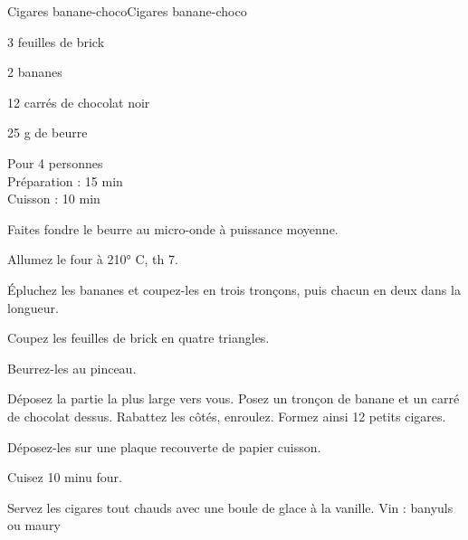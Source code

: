 \begin{recette}{Cigares banane-choco}{Cigares banane-choco}

\begin{ingredients}
3 feuilles de brick\par
2 bananes\par
12 carrés de chocolat noir\par
25 g de beurre\par
\end{ingredients}

\begin{infos}
Pour 4 personnes\\
Préparation : 15 min\\
Cuisson : 10 min\\
\end{infos}

\begin{etapes}
\item Faites fondre le beurre au micro-onde à puissance moyenne.
\item Allumez le four à 210° C, th 7.
\item Épluchez les bananes et coupez-les en trois tronçons, puis chacun en deux dans la longueur.
\item Coupez les feuilles de brick en quatre triangles.
\item Beurrez-les au pinceau.
\item Déposez la partie la plus large vers vous. Posez un tronçon de banane et un carré de chocolat dessus. Rabattez les côtés, enroulez. Formez ainsi 12 petits cigares.
\item Déposez-les sur une plaque recouverte de papier cuisson.
\item Cuisez 10 minu four.
\end{etapes}

\begin{conseils}
Servez les cigares tout chauds avec une boule de glace à la vanille.
Vin : banyuls ou maury
\end{conseils}

\end{recette}
